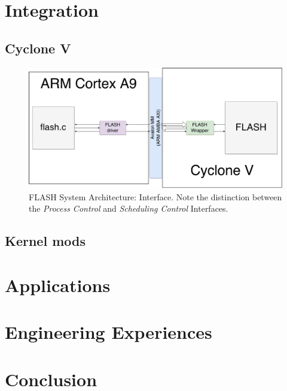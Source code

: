 \documentclass{sig-alternate-10pt}
\begin{document}
\section{Integration}
\label{sec:integration}
\subsection{Cyclone V}
\begin{figure}
	\begin{center}
		\includegraphics[width=0.9\linewidth]{fig/sockit-architecture.png}
		\caption{
			FLASH System Architecture: Interface.  Note the distinction between
			the \emph{Process Control} and \emph{Scheduling Control} Interfaces.
		}
		\label{fig:sockit_overview}
	\end{center}
\end{figure}


\subsection{Kernel mods}
\lipsum[1-3]


\section{Applications}
\label{sec:apps}
\lipsum[1-3]


\section{Engineering Experiences}
\label{sec:eng_exp}
\lipsum[1-3]


\section{Conclusion}
\label{sec:conclusion}
\lipsum[1]

\nocite{*}
{
	
	
}
\end{document}
